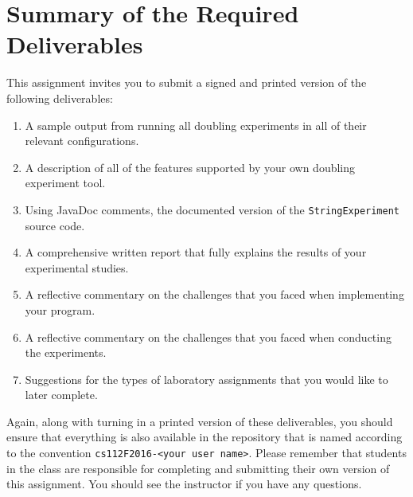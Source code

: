 \section*{Summary of the Required Deliverables}

This assignment invites you to submit a signed and printed version of the following deliverables:

\begin{enumerate}

  \itemsep0in

  \item A sample output from running all doubling experiments in all of their relevant configurations.

  \item A description of all of the features supported by your own doubling experiment tool.

  \item Using JavaDoc comments, the documented version of the {\tt StringExperiment} source code.

  \item A comprehensive written report that fully explains the results of your experimental studies.

  \item A reflective commentary on the challenges that you faced when implementing your program.

  \item A reflective commentary on the challenges that you faced when conducting the experiments.

  \item Suggestions for the types of laboratory assignments that you would like to later complete.

\end{enumerate}

Again, along with turning in a printed version of these deliverables, you should ensure that everything is also
available in the repository that is named according to the convention {\tt cs112F2016-<your user name>}. Please remember
that students in the class are responsible for completing and submitting their own version of this assignment. You
should see the instructor if you have any questions.



